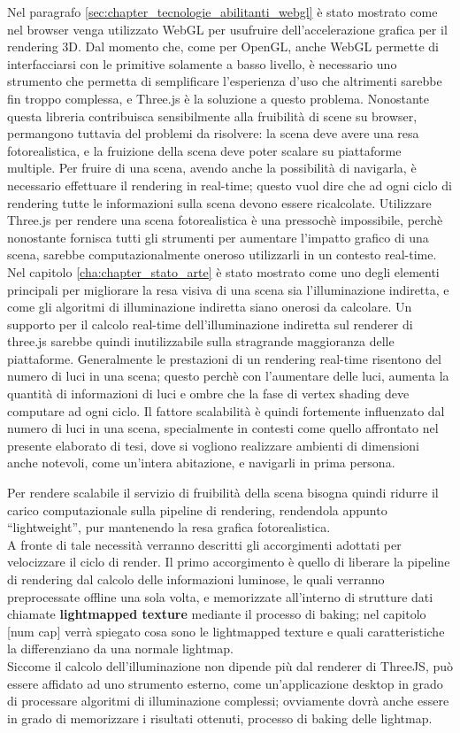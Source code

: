 Nel paragrafo \ref{sec:chapter_tecnologie_abilitanti_webgl} è stato mostrato come nel browser venga utilizzato WebGL per usufruire dell’accelerazione grafica per il rendering 3D. 
Dal momento che, come per OpenGL, anche WebGL permette di interfacciarsi con le primitive solamente a basso livello, è necessario uno strumento che permetta di semplificare l’esperienza d’uso che altrimenti sarebbe fin troppo complessa, e Three.js è la soluzione a questo problema. Nonostante questa libreria contribuisca sensibilmente alla fruibilità di scene su browser, permangono tuttavia del problemi da risolvere: la scena deve avere una resa fotorealistica, e la fruizione della scena deve poter scalare su piattaforme multiple.
Per fruire di una scena, avendo anche la possibilità di navigarla, è necessario effettuare il rendering in real-time; questo vuol dire che ad ogni ciclo di rendering tutte le informazioni sulla scena devono essere ricalcolate.
Utilizzare Three.js per rendere una scena fotorealistica è una pressochè impossibile, perchè nonostante fornisca tutti gli strumenti per aumentare l’impatto grafico di una scena, sarebbe computazionalmente oneroso utilizzarli in un contesto real-time.
Nel capitolo \ref{cha:chapter_stato_arte} è stato mostrato come uno degli elementi principali per migliorare la resa visiva di una scena sia l’illuminazione indiretta, e come gli algoritmi di illuminazione indiretta siano onerosi da calcolare. 
Un supporto per il calcolo real-time dell’illuminazione indiretta sul renderer di three.js sarebbe quindi inutilizzabile sulla stragrande maggioranza delle piattaforme. Generalmente le prestazioni di un rendering real-time risentono del numero di luci in una scena; questo perchè con l’aumentare delle luci, aumenta la quantità di informazioni di luci e ombre che la fase di vertex shading deve computare ad ogni ciclo. 
Il fattore scalabilità è quindi fortemente influenzato dal numero di luci in una scena, specialmente in contesti come quello affrontato nel presente elaborato di tesi, dove si vogliono realizzare ambienti di dimensioni anche notevoli, come un’intera abitazione, e navigarli in prima persona. 

Per rendere scalabile il servizio di fruibilità della scena bisogna quindi ridurre il carico computazionale sulla pipeline di rendering, rendendola appunto “lightweight”, pur mantenendo la resa grafica fotorealistica.
\\
A fronte di tale necessità verranno descritti gli accorgimenti adottati per velocizzare il ciclo di render.
Il primo accorgimento è quello di liberare la pipeline di rendering dal calcolo delle informazioni luminose, le quali verranno preprocessate offline una sola volta, e memorizzate all’interno di strutture dati chiamate \textbf{lightmapped texture} mediante il processo di baking; nel capitolo [num cap] verrà spiegato cosa sono le lightmapped texture e quali caratteristiche la differenziano da una normale lightmap. 
\\
Siccome il calcolo dell’illuminazione non dipende più dal renderer di ThreeJS, può essere affidato ad uno strumento esterno, come un’applicazione desktop in grado di processare algoritmi di illuminazione complessi; ovviamente dovrà anche essere in grado di memorizzare i risultati ottenuti, processo di baking delle lightmap.

